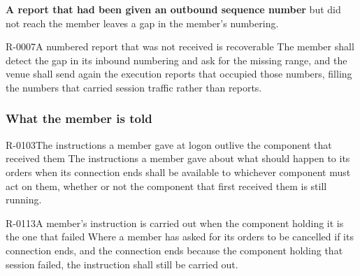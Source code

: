\textbf{A report that had been given an outbound sequence number} but did not
reach the member leaves a gap in the member's numbering.

\begin{requirement}{R-0007}{A numbered report that was not received is recoverable}
  The member shall detect the gap in its inbound numbering and ask for the
  missing range, and the venue shall send again the execution reports that
  occupied those numbers, filling the numbers that carried session traffic
  rather than reports.
\end{requirement}

\subsubsection{What the member is told}
\label{sec:ha:disabled:gateway:member}

\begin{requirement}{R-0103}{The instructions a member gave at logon outlive the component that received them}
  The instructions a member gave about what should happen to its orders when its
  connection ends shall be available to whichever component must act on them,
  whether or not the component that first received them is still running.
\end{requirement}

\begin{requirement}{R-0113}{A member's instruction is carried out when the component holding it is the one that failed}
  Where a member has asked for its orders to be cancelled if its connection
  ends, and the connection ends because the component holding that session
  failed, the instruction shall still be carried out.
\end{requirement}

